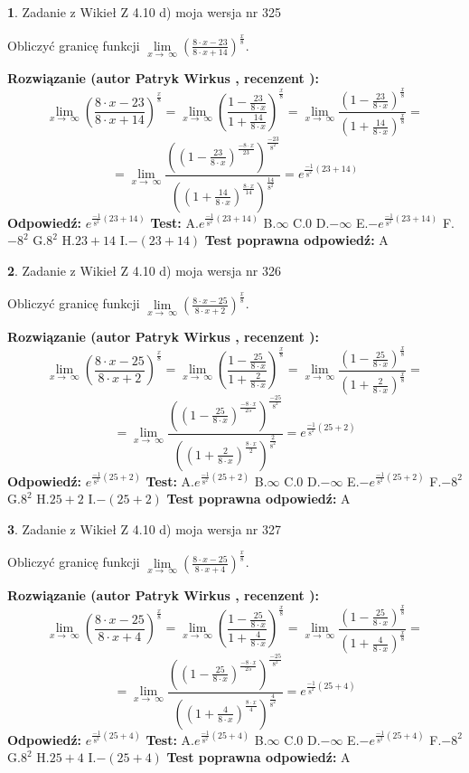 \documentclass[12pt, a4paper]{article}
\theoremstyle{definition} %
\newtheorem{zad}{}
\newcommand{\zadStart}[1]{\begin{zad}#1\newline}
\newcommand{\zadStop}{\end{zad}}
\newcommand{\rozwStart}[2]{\noindent \textbf{Rozwiązanie (autor #1 , recenzent #2): }\newline}
\newcommand{\rozwStop}{\newline}
\newcommand{\odpStart}{\noindent \textbf{Odpowiedź:}\newline}
\newcommand{\odpStop}{\newline}
\newcommand{\testStart}{\noindent \textbf{Test:}\newline}
\newcommand{\testStop}{\newline}
\newcommand{\kluczStart}{\noindent \textbf{Test poprawna odpowiedź:}\newline}
\newcommand{\kluczStop}{\newline}
\begin{document}
\zadStart{Zadanie z Wikieł Z 4.10 d) moja wersja nr 325}


Obliczyć granicę funkcji  $\lim\limits_{x\to\ \infty}(\frac{8\cdot x-23}{8\cdot x+14})^{\frac{x}{8}}$.
\zadStop
\rozwStart{Patryk Wirkus}{}
$$\lim\limits_{x\to\ \infty}(\frac{8\cdot x-23}{8\cdot x+14})^{\frac{x}{8}} = \lim\limits_{x\to\ \infty}(\frac{1-\frac{23}{8\cdot x}}{1+\frac{14}{8\cdot x}})^{\frac{x}{8}}=\lim\limits_{x\to\ \infty}\frac{(1-\frac{23}{8\cdot x})^{\frac{x}{8}}}{(1+\frac{14}{8\cdot x})^{\frac{x}{8}}}=$$
$$=\lim\limits_{x\to\ \infty}\frac{((1-\frac{23}{8\cdot x})^{\frac{-8\cdot x}{23}})^{\frac{-23}{8^{2}}}}{((1+\frac{14}{8\cdot x})^{\frac{8\cdot x}{14}})^{\frac{14}{8^{2}}}}=e^{\frac{-1}{8^{2}}(23+14)}$$
\rozwStop
\odpStart
$e^{\frac{-1}{8^{2}}(23+14)}$
\odpStop
\testStart
A.$e^{\frac{-1}{8^{2}}(23+14)}$ B.$\infty$ C.$0$ D.$-\infty$ E.$-e^{\frac{-1}{8^{2}}(23+14)}$
F.$-8^{2}$ G.$8^{2}$
H.$23+14$
I.$-(23+14)$
\testStop
\kluczStart
A
\kluczStop



\zadStart{Zadanie z Wikieł Z 4.10 d) moja wersja nr 326}


Obliczyć granicę funkcji  $\lim\limits_{x\to\ \infty}(\frac{8\cdot x-25}{8\cdot x+2})^{\frac{x}{8}}$.
\zadStop
\rozwStart{Patryk Wirkus}{}
$$\lim\limits_{x\to\ \infty}(\frac{8\cdot x-25}{8\cdot x+2})^{\frac{x}{8}} = \lim\limits_{x\to\ \infty}(\frac{1-\frac{25}{8\cdot x}}{1+\frac{2}{8\cdot x}})^{\frac{x}{8}}=\lim\limits_{x\to\ \infty}\frac{(1-\frac{25}{8\cdot x})^{\frac{x}{8}}}{(1+\frac{2}{8\cdot x})^{\frac{x}{8}}}=$$
$$=\lim\limits_{x\to\ \infty}\frac{((1-\frac{25}{8\cdot x})^{\frac{-8\cdot x}{25}})^{\frac{-25}{8^{2}}}}{((1+\frac{2}{8\cdot x})^{\frac{8\cdot x}{2}})^{\frac{2}{8^{2}}}}=e^{\frac{-1}{8^{2}}(25+2)}$$
\rozwStop
\odpStart
$e^{\frac{-1}{8^{2}}(25+2)}$
\odpStop
\testStart
A.$e^{\frac{-1}{8^{2}}(25+2)}$ B.$\infty$ C.$0$ D.$-\infty$ E.$-e^{\frac{-1}{8^{2}}(25+2)}$
F.$-8^{2}$ G.$8^{2}$
H.$25+2$
I.$-(25+2)$
\testStop
\kluczStart
A
\kluczStop



\zadStart{Zadanie z Wikieł Z 4.10 d) moja wersja nr 327}


Obliczyć granicę funkcji  $\lim\limits_{x\to\ \infty}(\frac{8\cdot x-25}{8\cdot x+4})^{\frac{x}{8}}$.
\zadStop
\rozwStart{Patryk Wirkus}{}
$$\lim\limits_{x\to\ \infty}(\frac{8\cdot x-25}{8\cdot x+4})^{\frac{x}{8}} = \lim\limits_{x\to\ \infty}(\frac{1-\frac{25}{8\cdot x}}{1+\frac{4}{8\cdot x}})^{\frac{x}{8}}=\lim\limits_{x\to\ \infty}\frac{(1-\frac{25}{8\cdot x})^{\frac{x}{8}}}{(1+\frac{4}{8\cdot x})^{\frac{x}{8}}}=$$
$$=\lim\limits_{x\to\ \infty}\frac{((1-\frac{25}{8\cdot x})^{\frac{-8\cdot x}{25}})^{\frac{-25}{8^{2}}}}{((1+\frac{4}{8\cdot x})^{\frac{8\cdot x}{4}})^{\frac{4}{8^{2}}}}=e^{\frac{-1}{8^{2}}(25+4)}$$
\rozwStop
\odpStart
$e^{\frac{-1}{8^{2}}(25+4)}$
\odpStop
\testStart
A.$e^{\frac{-1}{8^{2}}(25+4)}$ B.$\infty$ C.$0$ D.$-\infty$ E.$-e^{\frac{-1}{8^{2}}(25+4)}$
F.$-8^{2}$ G.$8^{2}$
H.$25+4$
I.$-(25+4)$
\testStop
\kluczStart
A
\kluczStop
\end{document}
